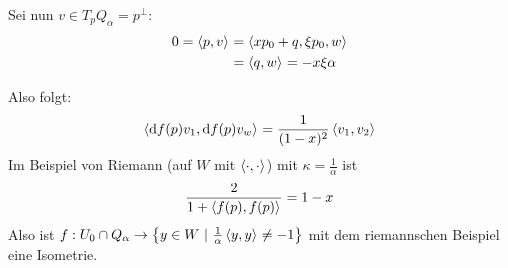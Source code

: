\documentclass{skript}
\begin{document}
\begin{dfn}
\begin{bsps}
\begin{enumerate}
        Sei nun $v\in T_pQ_\alpha = p^\perp$:
        \begin{align*}
          0 = \sprod{p,v} &= \sprod{xp_0 + q, \xi p_0, w} \\
          &= \sprod{q,w} = -x \xi \alpha
        \end{align*}

        Also folgt:
        \begin{align*}
          \sprod{\d f(p)v_1, \d f(p)v_w} = \frac{1}{(1-x)^2}\sprod{v_1, v_2}
        \end{align*}
        Im Beispiel von Riemann (auf $W$ mit $\sprod{\cdot,\cdot}$) mit $\kappa
        = \frac1\alpha$ ist
        \begin{align*}
          \frac{2}{1+ \sprod{f(p), f(p)}} = 1- x
        \end{align*}
        Also ist $f: U_0\cap Q_\alpha\to\mdef[y\in
        W]{\frac{1}{\alpha}\sprod{y,y} \ne -1}$ mit dem riemannschen Beispiel
        eine Isometrie.
    \end{enumerate}
  \end{bsps}
\end{dfn}
\end{document}
